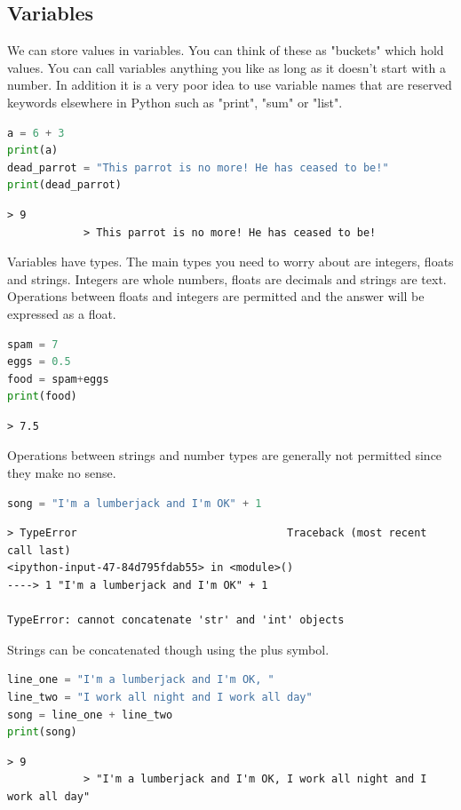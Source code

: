 	\subsection{Variables}\label{types}
		We can store values in variables. You can think of these as "buckets" which hold values. You can call variables anything you like as long as it doesn't start with a number. In addition it is a very poor idea to use variable names that are reserved keywords elsewhere in Python such as "print", "sum" or "list". 
		\begin{lstlisting}[language=Python]
a = 6 + 3
print(a)
dead_parrot = "This parrot is no more! He has ceased to be!"
print(dead_parrot)\end{lstlisting}
		\begin{verbatim}> 9
			> This parrot is no more! He has ceased to be!
		\end{verbatim}
		Variables have types. The main types you need to worry about are integers, floats and strings. Integers are whole numbers, floats are decimals and strings are text. Operations between floats and integers are permitted and the answer will be expressed as a float.
		\begin{lstlisting}[language=Python]
spam = 7
eggs = 0.5
food = spam+eggs
print(food)
\end{lstlisting}
		\begin{verbatim}> 7.5\end{verbatim}	
		Operations between strings and number types are generally not permitted since they make no sense.
		\begin{lstlisting}[language=Python]
song = "I'm a lumberjack and I'm OK" + 1\end{lstlisting}
		\begin{verbatim}> TypeError                                 Traceback (most recent call last)
<ipython-input-47-84d795fdab55> in <module>()
----> 1 "I'm a lumberjack and I'm OK" + 1

TypeError: cannot concatenate 'str' and 'int' objects\end{verbatim}

Strings can be concatenated though using the plus symbol.	
		\begin{lstlisting}[language=Python]
line_one = "I'm a lumberjack and I'm OK, "
line_two = "I work all night and I work all day"
song = line_one + line_two
print(song)\end{lstlisting}
		\begin{verbatim}> 9
			> "I'm a lumberjack and I'm OK, I work all night and I work all day"
		\end{verbatim}

